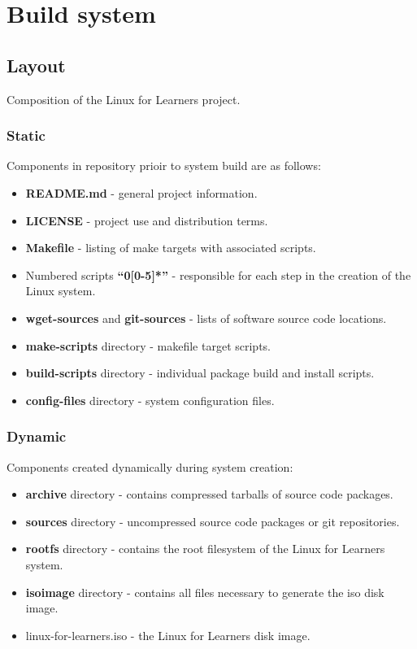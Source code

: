 \section{Build system}\label{Build system}

\subsection{Layout}

Composition of the Linux for Learners project.

\subsubsection{Static}

Components in repository prioir to system build are as follows:

\begin{itemize}
    \item \textbf{README.md} - general project information.
    \item \textbf{LICENSE} - project use and distribution terms.
    \item \textbf{Makefile} - listing of make targets with associated scripts.
    \item Numbered scripts \textbf{\enquote{0[0-5]*}} - responsible for each step in the creation of the Linux system.
    \item \textbf{wget-sources} and \textbf{git-sources} - lists of software source code locations.
    \item \textbf{make-scripts} directory - makefile target scripts.
    \item \textbf{build-scripts} directory - individual package build and install scripts.
    \item \textbf{config-files} directory - system configuration files.
\end{itemize}

\subsubsection{Dynamic}

Components created dynamically during system creation:

\begin{itemize}
    \item \textbf{archive} directory - contains compressed tarballs of source code packages.
    \item \textbf{sources} directory - uncompressed source code packages or git repositories.
    \item \textbf{rootfs} directory - contains the root filesystem of the Linux for Learners system.
    \item \textbf{isoimage} directory - contains all files necessary to generate the iso disk image.
    \item linux-for-learners.iso - the Linux for Learners disk image.
\end{itemize}

